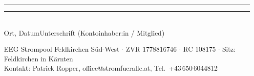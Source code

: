 \documentclass[10pt]{article}
\begin{document}
\vspace{1pt}
\vspace{0.55cm}
\noindent
\rule{7.5cm}{0.4pt}\hfill\rule{6.5cm}{0.4pt}\\[1pt]
{\small Ort, Datum}\hfill{\small Unterschrift (Kontoinhaber:in / Mitglied)}

\vspace{0pt}
\begin{tcolorbox}[enhanced, interior style={left color=greenverlauf, right color=turkisverlauf},
                  colframe=egreendark, sharp corners,
                  boxrule=0pt, left=4pt, right=10pt, top=2pt, bottom=2pt]

                  
\color{white}\small
EEG Strompool Feldkirchen Süd-West \;$\cdot$\; ZVR 1778816746 \;$\cdot$\; RC 108175 \;$\cdot$\;
Sitz: Feldkirchen in Kärnten\\
Kontakt: Patrick Ropper, \mbox{office@stromfueralle.at}, Tel.\ +43\,650\,6044812
\end{tcolorbox}
\end{document}
